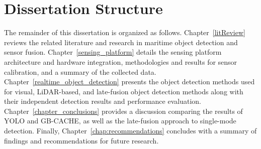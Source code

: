 \section{Dissertation Structure}
The remainder of this dissertation is organized as follows.  
Chapter~\ref{litReview} reviews the related literature and research in maritime object detection and sensor fusion. 
Chapter~\ref{sensing_platform} details the sensing platform architecture and hardware integration, methodologies and results for sensor calibration, and a summary of the collected data.  
Chapter~\ref{realtime_object_detection} presents the object detection methods used for visual, LiDAR-based, and late-fusion object detection methods along with their independent detection results and performance evaluation.
Chapter~\ref{chapter_conclusions} provides a discussion comparing the results of YOLO and GB-CACHE, as well as the late-fusion approach to single-mode detection.
Finally, Chapter~\ref{chap:recommendations} concludes with a summary of findings and recommendations for future research.
